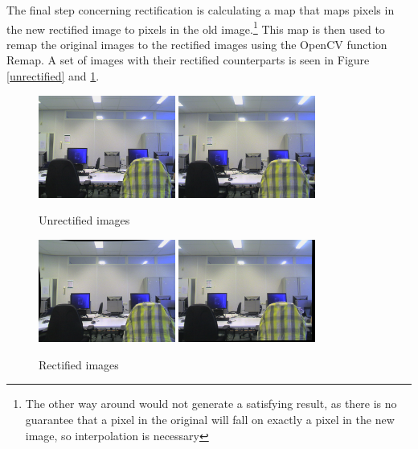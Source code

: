 \documentclass[a4paper]{article}
\begin{document}
The final step concerning rectification is calculating a map that maps
pixels in the new rectified image to pixels in the old
image.\footnote{The other way around would not generate a satisfying
result, as there is no guarantee that a pixel in the original will
fall on exactly a pixel in the new image, so interpolation is
necessary} This map is then used to remap the original images to the
rectified images using the OpenCV function Remap. A set of images with
their rectified counterparts is seen in Figure \ref{unrectified} and
\ref{rectified}. 

\begin{figure}[h] \centering
  \includegraphics[width=0.4\textwidth]{leftown}
  \includegraphics[width=0.4\textwidth]{rightown}
  \caption{Unrectified images}
  \label{unrectified}

  \includegraphics[width=0.4\textwidth]{leftownr}
  \includegraphics[width=0.4\textwidth]{rightownr}
  \caption{Rectified images}
  \label{rectified}
\end{figure} \newpage
\end{document}

